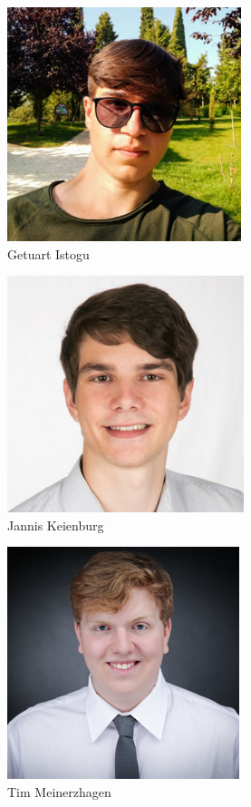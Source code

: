 \begin{figure}[h]
	\includegraphics{img/profil-getuart-istogu}
	\caption{Getuart Istogu}
	\label{fig:profil-getuart-istogu}
\end{figure}

\begin{figure}[h]
	\includegraphics{img/profil-jannis-keienburg}
	\caption{Jannis Keienburg}
	\label{fig:profil-jannis-keienburg}
\end{figure}

\begin{figure}[h]
	\includegraphics{img/profil-tim-meinerzhagen}
	\caption{Tim Meinerzhagen}
	\label{fig:profil-tim-meinerzhagen}
\end{figure}

